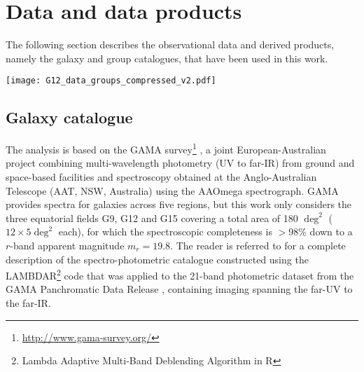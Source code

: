\documentclass[useAMS,usenatbib]{mnras}
\newcommand{\fog}{FoG\xspace}
\begin{document}
\section{Data and data products} %
\label{sec:data}

The following section describes the observational data and derived products, namely the galaxy and group catalogues, that have been used in this work. 


\begin{figure*}
\texttt{[image: G12\_data\_groups\_compressed\_v2.pdf]} %
\caption{Spatial distribution of whole galaxy population with $m_r < 19.8$ in the GAMA field G12 in the redshift range $0.03 \leq z \leq 0.25$ (grey points).   
Overplotted are galaxy group members, colour coded by the size of their group. Only groups having five or more members are shown. The top and bottom panels illustrate the galaxy group members before and after correcting for the \fog effect, respectively. 
}
\label{Fig:data_groups}
\end{figure*}


\subsection{Galaxy catalogue}   %
\label{subsec:galaxies}

The analysis is based on the GAMA survey\footnote{\href{http://www.gama-survey.org/}{http://www.gama-survey.org/}} \citep{Driver2009,Driver2011,Hopkins2013,Liske2015}, a joint European-Australian project combining  multi-wavelength photometry (UV to far-IR)  from ground and space-based facilities and spectroscopy obtained at the Anglo-Australian Telescope (AAT, NSW, Australia) using the AAOmega spectrograph. 
GAMA provides spectra for galaxies across five regions, but  this work  only considers  the three equatorial fields G9, G12 and G15 covering a total area of 180 $\deg^2$ ($12 \times 5 \deg^2$ each), for which
the spectroscopic completeness is $> 98$\% down to a $r$-band apparent magnitude $m_r = 19.8$.
The reader is referred to \citet[][]{Wright2016} for a complete description of the spectro-photometric catalogue constructed using 
the LAMBDAR\footnote{Lambda  Adaptive  Multi-Band  Deblending  Algorithm  in  R} code that was applied to  the  21-band
photometric  dataset  from  the GAMA Panchromatic Data Release \citep{Driver2016}, containing imaging spanning the far-UV
to the far-IR. 
 
\end{document}
